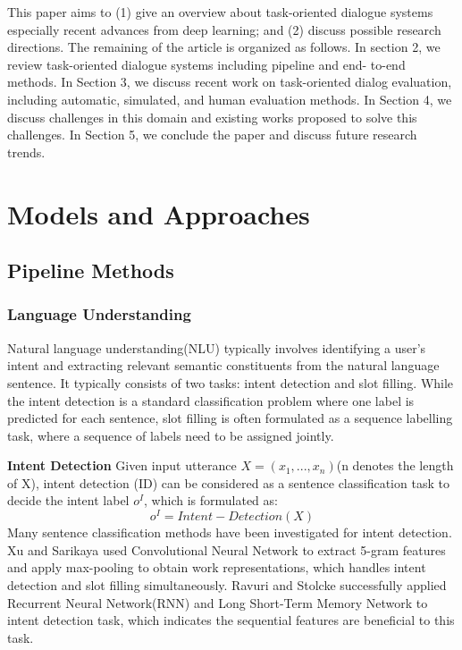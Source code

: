 \documentclass[10pt,twocolumn,letterpaper]{article}
\begin{document}
This paper aims to (1) give an overview about task-oriented dialogue systems especially recent advances from deep learning; and (2) discuss possible research directions. The remaining of the article is organized as follows. 
In section 2, we review task-oriented dialogue systems including pipeline and end- to-end methods. In Section 3, we discuss recent work on task-oriented dialog evaluation, including automatic, simulated, and human evaluation methods. In Section 4, we discuss challenges in this domain and existing works proposed to solve this challenges.  In Section 5, we conclude the paper and discuss future research trends.

\section{Models and Approaches}
\subsection{Pipeline Methods}


\subsubsection{Language Understanding}
Natural language understanding(NLU) typically involves identifying a user’s intent and extracting relevant semantic constituents from the natural language sentence. It typically consists of two tasks: intent detection and slot filling\cite{tur2011spoken}. While the intent detection is a standard classification problem where one label is predicted for each sentence, slot filling is often formulated as a sequence labelling task, where a sequence of labels need to be assigned jointly.

\textbf{Intent Detection}
Given input utterance $X=(x_1, ..., x_n)$(n denotes the length of X), intent detection (ID) can be considered as a sentence classification task to decide the intent label $o^I$, which is formulated as:
\begin{equation}
    o^I = Intent-Detection(X)
    \label{eq: ID}
\end{equation}
Many sentence classification methods have been investigated for intent detection. Xu and Sarikaya\cite{xu2013convolutional} used Convolutional Neural Network to extract 5-gram features and apply max-pooling to obtain work representations, which handles intent detection and slot filling simultaneously. Ravuri and Stolcke\cite{ravuri2015recurrent} successfully applied  Recurrent Neural Network(RNN) and Long Short-Term Memory Network to intent detection task, which indicates the sequential features are beneficial to this task.
\end{document}
